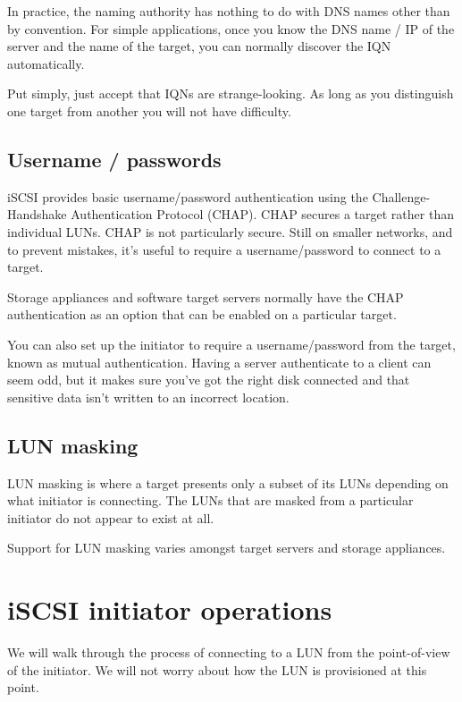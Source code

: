 In practice, the naming authority has nothing to do with DNS names other
than by convention. For simple applications, once you know the DNS name
/ IP of the server and the name of the target, you can normally discover
the IQN automatically.

Put simply, just accept that IQNs are strange-looking. As long as you
distinguish one target from another you will not have difficulty.

\subsection{Username / passwords}
\label{sec:username-passwords}

iSCSI provides basic username/password authentication using the
Challenge-Handshake Authentication Protocol (CHAP). CHAP secures a
target rather than individual LUNs. CHAP is not particularly secure.
Still on smaller networks, and to prevent mistakes, it's useful to
require a username/password to connect to a target.

Storage appliances and software target servers normally have the CHAP
authentication as an option that can be enabled on a particular target.

You can also set up the initiator to require a username/password from
the target, known as mutual authentication. Having a server authenticate
to a client can seem odd, but it makes sure you've got the right disk
connected and that sensitive data isn't written to an incorrect
location.

\subsection{LUN masking}
\label{sec:lun-masking}

LUN masking is where a target presents only a subset of its LUNs
depending on what initiator is connecting. The LUNs that are masked from
a particular initiator do not appear to exist at all.

Support for LUN masking varies amongst target servers and storage
appliances.

\section{iSCSI initiator operations}
\label{sec:iscsi-initiator-operations}

We will walk through the process of connecting to a LUN from the
point-of-view of the initiator. We will not worry about how the LUN is
provisioned at this point.

